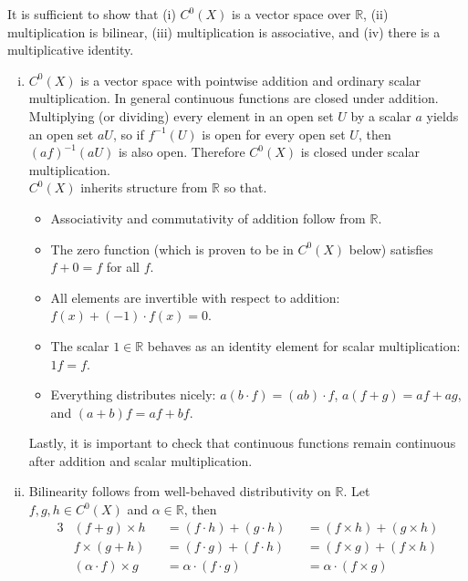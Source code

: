 \documentclass{article}
\newenvironment{problem}[2][Problem]{\begin{trivlist}
\item[\hskip \labelsep {\bfseries #1}\hskip \labelsep {\bfseries #2.}]}{\end{trivlist}}
\newenvironment{problempart}[1]{\begin{trivlist}\item[\textbf{Part #1.}]}{\end{trivlist}}
\begin{document}
\begin{problem}{7}
\begin{problempart}{(a)}
  \end{problempart}
  \begin{problempart}{(b)}
    It is sufficient to show that
    (i) $C^0(X)$ is a vector space over $\mathbb{R}$,
    (ii) multiplication is bilinear,
    (iii) multiplication is associative, and
    (iv) there is a multiplicative identity.
    \begin{enumerate}[(i)]
      \item $C^0(X)$ is a vector space with pointwise addition and ordinary scalar
        multiplication. In general continuous functions are closed under addition.
        Multiplying (or dividing) every element in an open set $U$ by a scalar $a$
        yields an open set $aU$,
        so if $f^{-1}(U)$ is open for every open set $U$,
        then $(af)^{-1}(aU)$ is also open.
        Therefore $C^0(X)$ is closed under scalar multiplication.\\
        $C^0(X)$ inherits structure from $\mathbb{R}$ so that.
        \begin{itemize}
          \item Associativity and commutativity of addition follow from $\mathbb{R}$.
          \item The zero function (which is proven to be in $C^0(X)$ below) satisfies $f + 0 = f$ for all $f$.
          \item All elements are invertible with respect to addition: $f(x) + (-1)\cdot f(x) = 0$.
          \item The scalar $1 \in \mathbb{R}$ behaves as an identity element for scalar multiplication: $1f = f$.
          \item Everything distributes nicely: $a(b \cdot f) = (ab) \cdot f$, $a(f + g) = af + ag$, and $(a + b)f = af + bf$.
        \end{itemize}
        Lastly, it is important to check that continuous functions remain
        continuous after addition and scalar multiplication.
      \item Bilinearity follows from well-behaved distributivity on $\mathbb{R}.$
        Let $f,g,h\in C^0(X)$ and $\alpha \in \mathbb{R}$, then
      \begin{alignat*}{3}
        &(f + g) \times h &&= (f \cdot h) + (g \cdot h) &&= (f \times h) + (g \times h)\\
        &f \times (g + h) &&= (f \cdot g) + (f \cdot h) &&= (f \times g) + (f \times h)\\
        &(\alpha \cdot f) \times g &&= \alpha \cdot (f \cdot g) &&= \alpha \cdot (f \times g) \\

\end{alignat*}
\end{enumerate}
\end{problempart}
\end{problem}
\end{document}
